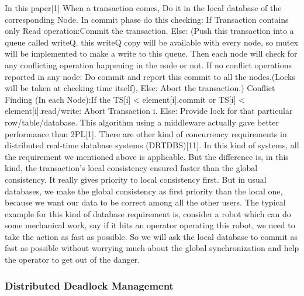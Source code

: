 \documentclass{article}[12pt,a4paper]
\begin{document}
In this paper[1] When a transaction comes, Do it in the local database of the corresponding Node. In commit phase do this checking: If Transaction contains only Read operation:Commit the transaction. Else: (Push this transaction into a queue called writeQ. this writeQ copy will be available with every node, so mutex will be implemented to make a write to this queue. Then each node will check for any conflicting operation happening in the node or not. If no conflict operations reported in any node: Do commit and report this commit to all the nodes.(Locks will be taken at checking time itself), Else: Abort the transaction.)
Conflict Finding (In each Node):If the TS[i] < element[i].commit or TS[i] < element[i].read/write: Abort Transaction i. Else: Provide lock for that particular row/table/database. This algorithm using a middleware actually gave better performance than 2PL[1].
	There are other kind of concurrency requirements in distributed real-time database systems (DRTDBS)[11]. In this kind of systems, all the requirement we mentioned above is applicable. But the difference is, in this kind, the transaction’s local consistency ensured faster than the global consistency. It really gives priority to local consistency first. But in usual databases, we make the global consistency as first priority than the local one, because we want our data to be correct among all the other users. The typical example for this kind of database requirement is, consider a robot which can do some mechanical work, say if it hits an operator operating this robot, we need to take the action as fast as possible. So we will ask the local database to commit as fast as possible without worrying much about the global synchronization and help the operator to get out of the danger.










\subsubsection {Distributed Deadlock Management}
\end{document}
